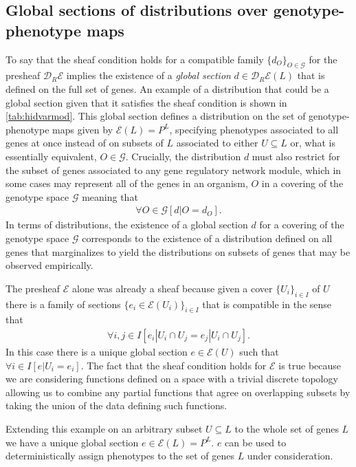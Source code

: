 \subsection{Global sections of distributions over genotype-phenotype maps}\label{sec:globalsectiongpms}
To say that the sheaf condition holds for a compatible family $\{d_O\}_{O \in \mathcal{G}}$ for the presheaf $\mathcal{D}_R\mathcal{E}$ implies the existence of a \emph{global section} $d \in \mathcal{D}_R\mathcal{E}(L)$ that is defined on the full set of genes. An example of a distribution that could be a global section given that it satisfies the sheaf condition is shown in \ref{tab:hidvarmod}. This global section defines a distribution on the set of genotype-phenotype maps given by $\mathcal{E}(L) = P^L$, specifying phenotypes associated to all genes at once instead of on subsets of $L$ associated to either $U \subseteq L$ or, what is essentially equivalent, $O \in \mathcal{G}$. Crucially, the distribution $d$ must also restrict for the subset of genes associated to any gene regulatory network module, which in some cases may represent all of the genes in an organism, $O$ in a covering of the genotype space $\mathcal{G}$ meaning that
\begin{eqnarray}
\forall O \in \mathcal{G} \left[ d|O = d_O \right].
\end{eqnarray}
In terms of distributions, the existence of a global section $d$ for a covering of the genotype space $\mathcal{G}$ corresponds to the existence of a distribution defined on all genes that marginalizes to yield the distributions on subsets of genes that may be observed empirically.

The presheaf $\mathcal{E}$ alone was already a sheaf because given a cover $\{U_i\}_{i \in I}$ of $U$ there is a family of sections $\{e_i \in \mathcal{E}(U_i)\}_{i \in I}$ that is compatible in the sense that
\begin{eqnarray}
\forall i,j \in I \left[ e_i|U_i \cap U_j = e_j|U_i \cap U_j \right].
\end{eqnarray}
In this case there is a unique global section $e \in \mathcal{E}(U)$ such that $\forall i \in I \left[ e|U_i = e_i \right]$. The fact that the sheaf condition holds for $\mathcal{E}$ is true because we are considering functions defined on a space with a trivial discrete topology allowing us to combine any partial functions that agree on overlapping subsets by taking the union of the data defining such functions.

Extending this example on an arbitrary subset $U \subseteq L$ to the whole set of genes $L$ we have a unique global section $e \in \mathcal{E}(L) = P^L$. $e$ can be used to deterministically assign phenotypes to the set of genes $L$ under consideration.

